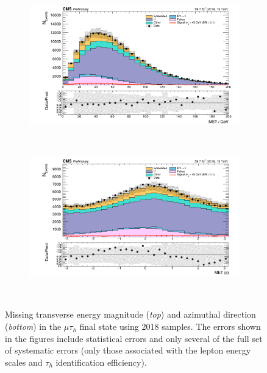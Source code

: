 \begin{figure}[ht]
    \centering   
    \begin{subfigure}{0.75\textwidth}
        \includegraphics[width=1.0\textwidth]{figures/ch-11-asymmetric/mutau_met.png}
    \end{subfigure} \\ 
    \begin{subfigure}{0.75\textwidth}
        \includegraphics[width=1.0\textwidth]{figures/ch-11-asymmetric/mutau_metphi.png}
    \end{subfigure} \\   
    \caption{Missing transverse energy magnitude (\textit{top}) and azimuthal direction (\textit{bottom}) in the $\mu\tau_{h}$ final state using 2018 samples. The errors shown in the figures include statistical errors and only several of the full set of systematic errors (only those associated with the lepton energy scales and $\tau_{h}$ identification efficiency).}
    \label{fig:nanoAOD_mutau_control_plots_met_metphi}
\end{figure}
